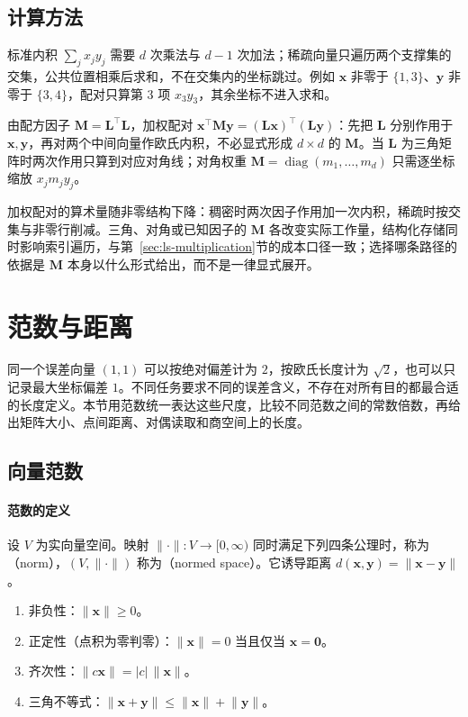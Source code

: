\subsection{计算方法}

标准内积 $\sum_j x_jy_j$ 需要 $d$ 次乘法与 $d-1$ 次加法；稀疏向量只遍历两个支撑集的交集，公共位置相乘后求和，不在交集内的坐标跳过。例如 $\bm x$ 非零于 $\{1,3\}$、$\bm y$ 非零于 $\{3,4\}$，配对只算第 $3$ 项 $x_3y_3$，其余坐标不进入求和。

由配方因子 $\bm M=\bm L^\top\bm L$，加权配对 $\bm x^\top\bm M\bm y=(\bm L\bm x)^\top(\bm L\bm y)$：先把 $\bm L$ 分别作用于 $\bm x,\bm y$，再对两个中间向量作欧氏内积，不必显式形成 $d\times d$ 的 $\bm M$。当 $\bm L$ 为三角矩阵时两次作用只算到对应对角线；对角权重 $\bm M=\operatorname{diag}(m_1,\dots,m_d)$ 只需逐坐标缩放 $x_jm_jy_j$。

加权配对的算术量随非零结构下降：稠密时两次因子作用加一次内积，稀疏时按交集与非零行削减。三角、对角或已知因子的 $\bm M$ 各改变实际工作量，结构化存储同时影响索引遍历，与第~\ref{sec:ls-multiplication}节的成本口径一致；选择哪条路径的依据是 $\bm M$ 本身以什么形式给出，而不是一律显式展开。

\section{范数与距离}
\label{sec:ls-norms-distances}
\label{sec:linear-algebra-distance-relations}
\label{sec:ch06-map-comparison}
\label{sec:matrix-analysis-norms-effective-rank}
\label{sec:linear-algebra-length-angle-distance}

同一个误差向量 $(1,1)$ 可以按绝对偏差计为 $2$，按欧氏长度计为 $\sqrt2$，也可以只记录最大坐标偏差 $1$。不同任务要求不同的误差含义，不存在对所有目的都最合适的长度定义。本节用范数统一表达这些尺度，比较不同范数之间的常数倍数，再给出矩阵大小、点间距离、对偶读取和商空间上的长度。

\subsection{向量范数}

\paragraph{范数的定义}

\begin{definition}[赋范空间]
\label{def:functional-normed-space}
设 $V$ 为实向量空间。映射 $\lVert\cdot\rVert:V\to[0,\infty)$ 同时满足下列四条公理时，称为（norm），$(V,\lVert\cdot\rVert)$ 称为（normed space）。它诱导距离 $d(\bm x,\bm y)=\lVert\bm x-\bm y\rVert$。
\begin{enumerate}
 \item 非负性：$\lVert\bm x\rVert\geq0$。
 \item 正定性（点积为零判零）：$\lVert\bm x\rVert=0$ 当且仅当 $\bm x=\bm0$。
 \item 齐次性：$\lVert c\bm x\rVert=|c|\,\lVert\bm x\rVert$。
 \item 三角不等式：$\lVert\bm x+\bm y\rVert\leq\lVert\bm x\rVert+\lVert\bm y\rVert$。
\end{enumerate}
\end{definition}

